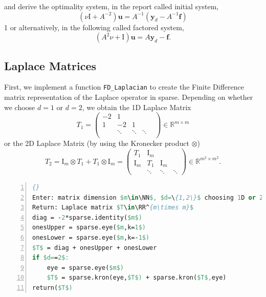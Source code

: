 \documentclass{amsart}
\theoremstyle{definition}
\theoremstyle{remark}
\numberwithin{equation}{section}
\newcommand{\RR}{\mathbb{R}}
\newcommand{\NN}{\mathbb{N}}
\renewcommand{\vec}{\textbf}
\begin{document}
and derive the optimality system, in the report called initial system,
\begin{equation}
\left(\nu\text{I}+A^{-2}\right) \vec{u} =A^{-1}\left(\vec{y}_d-A^{-1}\vec{f}\right) \label{eq:normalOptimalitySystem}
\end{equation}1
or alternatively, in the following called factored system,
\begin{equation}
\left(A^2\nu+\text{I}\right) \vec{u} =A\vec{y}_d-\vec{f}. \label{eq:factoredOptimalitySystem}
\end{equation}





\subsection{Laplace Matrices}
First, we implement a function \texttt{FD\_Laplacian} to create the Finite Difference matrix representation of the Laplace operator in sparse.
Depending on whether we choose $d=1$ or $d=2$, we obtain the 1D Laplace Matrix 
$$ T_1 = 
\begin{pmatrix}
-2 & 1 & & & \\
1 & -2 & 1 & & \\
& \ddots & \ddots & \ddots & \\
\end{pmatrix} \in\RR^{m\times m}
$$
or the 2D Laplace Matrix (by using the Kronecker product $\otimes$)
$$ T_2 = \text{I}_m \otimes T_1 + T_1 \otimes \text{I}_m= 
\begin{pmatrix}
T_1 & \text{I}_m & & \\
\text{I}_m & T_1 & \text{I}_m & \\
& \ddots & \ddots & \ddots
\end{pmatrix} \in\RR^{m^2\times m^2}.
$$

\begin{lstlisting}[mathescape, language=Pascal, title=FD\_Laplacian,
frame=single, numbers=left, numberstyle=\tiny, tabsize=2,
morekeywords={Enter, Return, elif}, deletekeywords={of,or}, keywordstyle=\bfseries]{}
Enter: matrix dimension $m\in\NN$, $d=\{1,2\}$ choosing 1D or 2D
Return: Laplace matrix $T\in\RR^{m\times m}$
diag = -2*sparse.identity($m$)
onesUpper = sparse.eye($m,k=1$)
onesLower = sparse.eye($m,k=-1$)
$T$ = diag + onesUpper + onesLower
if $d==2$:
	eye = sparse.eye($m$)
	$T$ = sparse.kron(eye,$T$) + sparse.kron($T$,eye)
return($T$)
\end{lstlisting}
\end{document}
